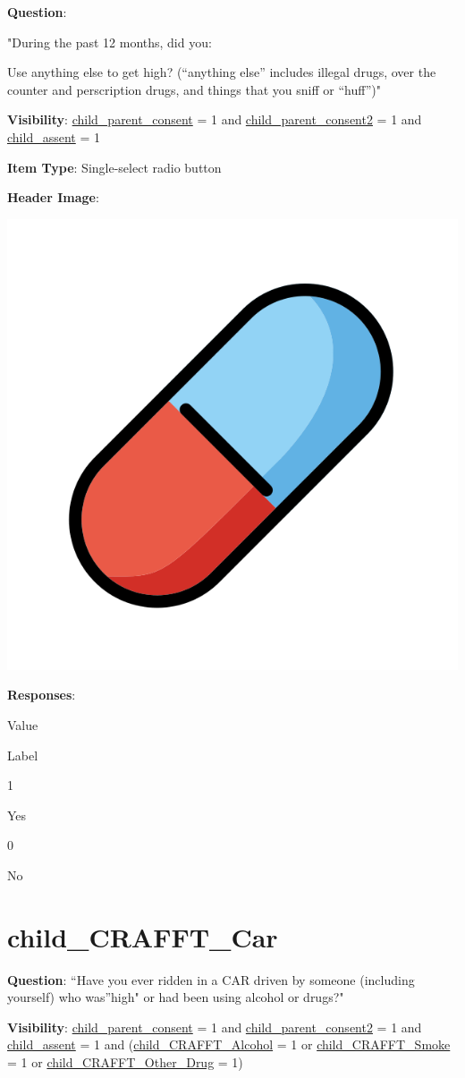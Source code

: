 \documentclass[]{book}
\begin{document}
\textbf{Question}:

"During the past 12 months, did you:

Use anything else to get high? (``anything else'' includes illegal drugs, over the counter and perscription drugs, and things that you sniff or ``huff'')"

\textbf{Visibility}: \protect\hyperlink{child_parent_consent}{child\_parent\_consent} = 1 and \protect\hyperlink{child_parent_consent2}{child\_parent\_consent2} = 1 and \protect\hyperlink{child_assent}{child\_assent} = 1

\textbf{Item Type}: Single-select radio button

\textbf{Header Image}:

\begin{flushleft}\includegraphics[width=0.33\linewidth]{downloadFigs4latex_HBN_PMHS_Codebook/child_CRAFFT_Other_Drug_headerImg} \end{flushleft}

\textbf{Responses}:

Value

Label

1

Yes

0

No

\hypertarget{child_crafft_car}{%
\section{child\_CRAFFT\_Car}\label{child_crafft_car}}

\textbf{Question}: ``Have you ever ridden in a CAR driven by someone (including yourself) who was''high" or had been using alcohol or drugs?"

\textbf{Visibility}: \protect\hyperlink{child_parent_consent}{child\_parent\_consent} = 1 and \protect\hyperlink{child_parent_consent2}{child\_parent\_consent2} = 1 and \protect\hyperlink{child_assent}{child\_assent} = 1 and (\protect\hyperlink{child_crafft_alcohol}{child\_CRAFFT\_Alcohol} = 1 or \protect\hyperlink{child_crafft_smoke}{child\_CRAFFT\_Smoke} = 1 or \protect\hyperlink{child_crafft_other_drug}{child\_CRAFFT\_Other\_Drug} = 1)
\end{document}
